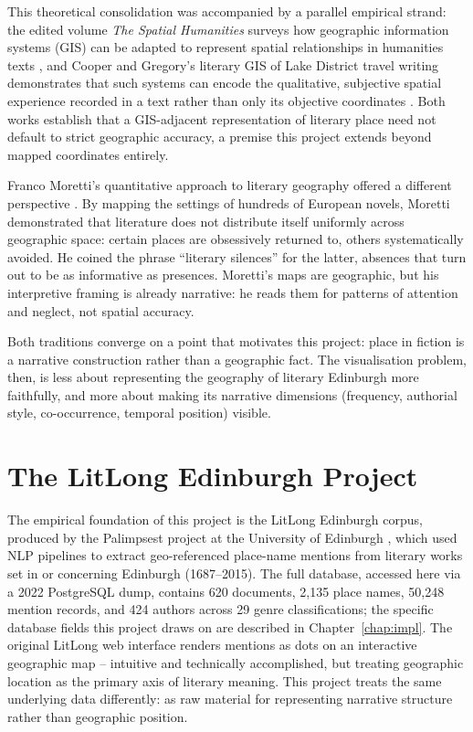 \documentclass[logo,msc]{infthesis}
\begin{document}
This theoretical consolidation was accompanied by a parallel empirical strand: the edited volume \emph{The Spatial Humanities} surveys how geographic information systems (GIS) can be adapted to represent spatial relationships in humanities texts \cite{bodenhamer2010}, and Cooper and Gregory's literary GIS of Lake District travel writing demonstrates that such systems can encode the qualitative, subjective spatial experience recorded in a text rather than only its objective coordinates \cite{cooper2011}. Both works establish that a GIS-adjacent representation of literary place need not default to strict geographic accuracy, a premise this project extends beyond mapped coordinates entirely.

Franco Moretti's quantitative approach to literary geography offered a different perspective \cite{moretti2005}. By mapping the settings of hundreds of European novels, Moretti demonstrated that literature does not distribute itself uniformly across geographic space: certain places are obsessively returned to, others systematically avoided. He coined the phrase ``literary silences'' for the latter, absences that turn out to be as informative as presences. Moretti's maps are geographic, but his interpretive framing is already narrative: he reads them for patterns of attention and neglect, not spatial accuracy.

Both traditions converge on a point that motivates this project: place in fiction is a narrative construction rather than a geographic fact. The visualisation problem, then, is less about representing the geography of literary Edinburgh more faithfully, and more about making its narrative dimensions (frequency, authorial style, co-occurrence, temporal position) visible.
 
\section{The LitLong Edinburgh Project}
 
The empirical foundation of this project is the LitLong Edinburgh corpus, produced by the Palimpsest project at the University of Edinburgh \cite{anderson2016}, which used NLP pipelines to extract geo-referenced place-name mentions from literary works set in or concerning Edinburgh (1687--2015). The full database, accessed here via a 2022 PostgreSQL dump, contains 620 documents, 2,135 place names, 50,248 mention records, and 424 authors across 29 genre classifications; the specific database fields this project draws on are described in Chapter~\ref{chap:impl}. The original LitLong web interface renders mentions as dots on an interactive geographic map -- intuitive and technically accomplished, but treating geographic location as the primary axis of literary meaning. This project treats the same underlying data differently: as raw material for representing narrative structure rather than geographic position.
 
\end{document}
